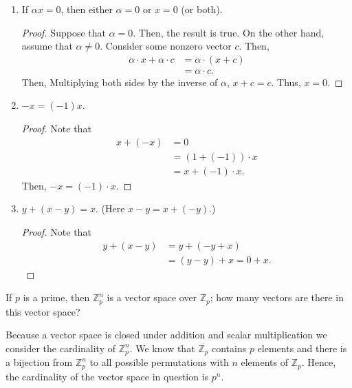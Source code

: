 \documentclass[12pt]{article}
\newcommand{\Z}{\mathbb{Z}}
\newenvironment{problem}[2][Problem]{\begin{trivlist} \item[\hskip \labelsep {\bfseries #1}\hskip \labelsep {\bfseries #2.}]}{\end{trivlist}}
\newenvironment{solution}[1][Solution]{\begin{trivlist} \item[\hskip \labelsep {\bfseries #1}]}{\end{trivlist}}
\begin{document}
\begin{problem}{1}
\begin{enumerate}
\item If $\alpha x = 0$, then either $\alpha = 0$ or $x=0$ (or both).
\begin{proof}
  Suppose that $\alpha = 0$. Then, the result is true. On the other hand, assume that $\alpha \neq 0$. Consider some nonzero vector $c$. Then, 
\begin{align*}
  \alpha\cdot x + \alpha\cdot c &= \alpha\cdot (x+c)\\
  &= \alpha\cdot c.
\end{align*}
Then, Multiplying both sides by the inverse of $\alpha$, $x+c = c$. Thus, $x=0$.
\end{proof}
  \item $-x=(-1)x$.
\begin{proof}
  Note that 
\begin{align*}
  x + (-x ) &= 0 \\
  &= (1+(-1))\cdot x \\
  &= x + (-1)\cdot x. 
\end{align*}
Then, $-x = (-1)\cdot x$.
\end{proof}
  \item $y+(x-y) = x$. (Here $x-y=x+(-y)$.)
\begin{proof}
Note that
\begin{align*}
  y+(x-y) &= y+(-y+x) \\
  &= (y-y)+x = 0+x.
\end{align*}
\end{proof}
\end{enumerate}
\end{problem}
\begin{problem}{2}
  If $p$ is a prime, then $\Z_{p}^{n}$ is a vector space over $\Z_{p}$; how many vectors are there in this vector space?
\begin{solution}
  Because a vector space is closed under addition and scalar multiplication we consider the cardinality of $\Z_{p}^{n}$. We know that $\Z_{p}$ contains $p$ elements and there is a bijection from $\Z_{p}^{n}$ to all possible permutations with $n$ elements of $\Z_{p}$. Hence, the cardinality of the vector space in question is $p^{n}$. 
\end{solution}
\end{problem}
\end{document}
